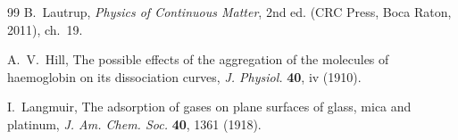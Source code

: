 \documentclass[twocolumn]{iopjournal}
\theoremstyle{definition}
\theoremstyle{remark}
\begin{document}
\begin{thebibliography}{99}
B.~Lautrup,
\textit{Physics of Continuous Matter}, 2nd ed. (CRC Press, Boca Raton,
2011), ch.~19.

A.~V.~Hill,
The possible effects of the aggregation of the molecules of
haemoglobin on its dissociation curves, \textit{J. Physiol.}
\textbf{40}, iv (1910).

I.~Langmuir,
The adsorption of gases on plane surfaces of glass, mica and platinum,
\textit{J. Am. Chem. Soc.} \textbf{40}, 1361 (1918).

\end{thebibliography}
\end{document}

